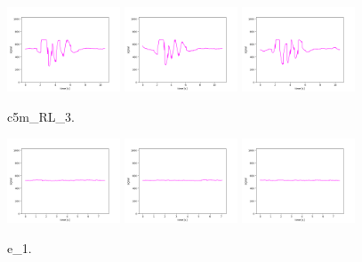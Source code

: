 \begin{figure}[!ht]
\begin{center}
\includegraphics[width=0.3\textwidth]{../data/c5m_RL_3/c5m_RL_3_1.png}
\includegraphics[width=0.3\textwidth]{../data/c5m_RL_3/c5m_RL_3_2.png}
\includegraphics[width=0.3\textwidth]{../data/c5m_RL_3/c5m_RL_3_3.png}
\caption{c5m\_RL\_3.\label{fig:c5m_RL_3}}
\end{center}
\end{figure}

\begin{figure}[!ht]
\begin{center}
\includegraphics[width=0.3\textwidth]{../data/e_1/e_1_1.png}
\includegraphics[width=0.3\textwidth]{../data/e_1/e_1_2.png}
\includegraphics[width=0.3\textwidth]{../data/e_1/e_1_3.png}
\caption{e\_1.\label{fig:e_1}}
\end{center}
\end{figure}

